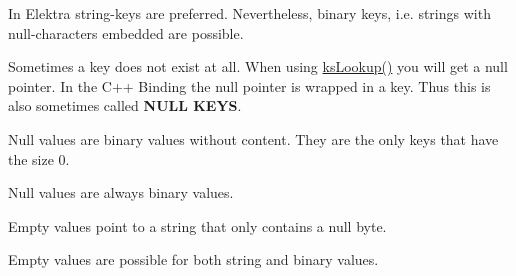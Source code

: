 In Elektra string-\/keys are preferred. Nevertheless, binary keys, i.\+e. strings with null-\/characters embedded are possible.

Sometimes a key does not exist at all. When using \hyperlink{group__keyset_ga60f1ddcf23272f2b29b90e92ebe9b56f}{ks\+Lookup()} you will get a null pointer. In the C++ Binding the null pointer is wrapped in a key. Thus this is also sometimes called {\bfseries N\+U\+LL K\+E\+YS}.

Null values are binary values without content. They are the only keys that have the size 0.

Null values are always binary values.

Empty values point to a string that only contains a null byte.

Empty values are possible for both string and binary values. 